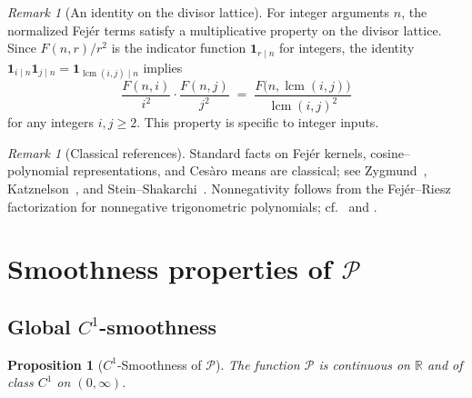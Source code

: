 \documentclass[11pt,a4paper]{amsart}
\newcommand{\R}{\mathbb{R}}
\theoremstyle{plain}
\newtheorem{proposition}[theorem]{Proposition}
\theoremstyle{definition}
\theoremstyle{remark}
\newtheorem{remark}[theorem]{Remark}
\begin{document}
\begin{remark}[An identity on the divisor lattice]
For integer arguments $n$, the normalized Fejér terms satisfy a multiplicative property on the divisor lattice. Since $F(n,r)/r^2$ is the indicator function $\mathbf{1}_{r\mid n}$ for integers, the identity $\mathbf{1}_{i\mid n}\mathbf{1}_{j\mid n}=\mathbf{1}_{\operatorname{lcm}(i,j)\mid n}$ implies
\[
\frac{F(n,i)}{i^2}\cdot \frac{F(n,j)}{j^2}\;=\;\frac{F\bigl(n,\operatorname{lcm}(i,j)\bigr)}{\operatorname{lcm}(i,j)^2}
\]
for any integers $i,j\ge 2$. This property is specific to integer inputs.
\end{remark}

\begin{remark}[Classical references]
Standard facts on Fejér kernels, cosine–polynomial representations, and Cesàro means are classical; see Zygmund~\cite[Chap.~I, §5; Chap.~III]{zygmund2002}, Katznelson~\cite[Chap.~I]{katznelson2004}, and Stein–Shakarchi~\cite[Chap.~2]{stein2003}. Nonnegativity follows from the Fejér–Riesz factorization for nonnegative trigonometric polynomials; cf.\ \cite[Chap.~V]{zygmund2002} and \cite[Chap.~II]{katznelson2004}.
\end{remark}


\section{Smoothness properties of $\mathcal{P}$}

\subsection{Global $C^{1}$-smoothness}

\begin{proposition}[$C^1$-Smoothness of $\mathcal{P}$]\label{prop:C1}
The function $\mathcal{P}$ is continuous on $\R$ and of class $C^1$ on $(0,\infty)$.
\end{proposition}
\end{document}
